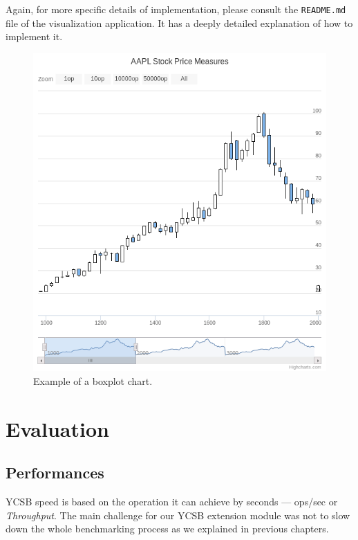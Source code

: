 \documentclass[a4paper,11pt]{report}
\begin{document}
Again, for more specific details of implementation, please consult the \texttt{README.md} file of the visualization application. It has a deeply detailed explanation of how to implement it.

\begin{figure}[ht]
\begin{center}
\includegraphics[scale=0.6]{images/boxplot.png}
\caption{Example of a boxplot chart.}
\label{boxplot}
\end{center}
\end{figure}

\chapter{Evaluation}

\section{Performances}

YCSB speed is based on the operation it can achieve by seconds --- ops/sec or \textit{Throughput}. The main challenge for our YCSB extension module was not to slow down the whole benchmarking process as we explained in previous chapters.
\end{document}
